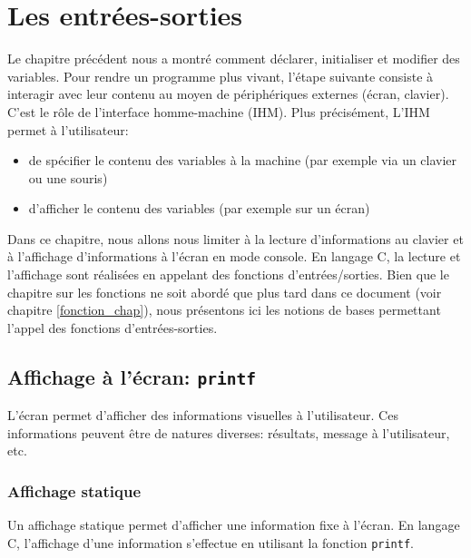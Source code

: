 \documentclass[a4paper,11pt]{book}
\theoremstyle{definition}
\begin{document}
\chapter{Les entrées-sorties}
Le chapitre précédent nous a montré comment déclarer, initialiser et modifier des variables. Pour rendre un programme plus vivant, l'étape suivante consiste à interagir avec leur contenu au moyen de périphériques externes (écran, clavier). C'est le rôle de l'interface homme-machine (IHM). Plus précisément, L'IHM permet à l'utilisateur:
\begin{itemize}
\item de spécifier le contenu des variables à la
machine (par exemple via un clavier
ou une souris) \item d'afficher le contenu des
variables (par exemple sur un écran)
\end{itemize}
Dans ce chapitre, nous allons nous limiter à la lecture d'informations au
clavier et à l'affichage d'informations à l'écran en mode console. En langage C, la
lecture et l'affichage sont réalisées en appelant des fonctions
d'entrées/sorties. Bien que le chapitre sur les fonctions ne soit abordé que plus tard dans ce document (voir chapitre \ref{fonction_chap}), nous présentons ici les notions de bases permettant l'appel des fonctions d'entrées-sorties.

\section{Affichage à l'écran: \texttt{printf}}
 L'écran permet d'afficher des informations
visuelles à l'utilisateur. Ces informations peuvent être de
natures diverses: résultats, message à l'utilisateur, etc.
\subsection{Affichage statique}
Un affichage statique permet d'afficher une information fixe à
l'écran. En langage C, l'affichage d'une information s'effectue en
utilisant la fonction \texttt{printf}.
\end{document}
